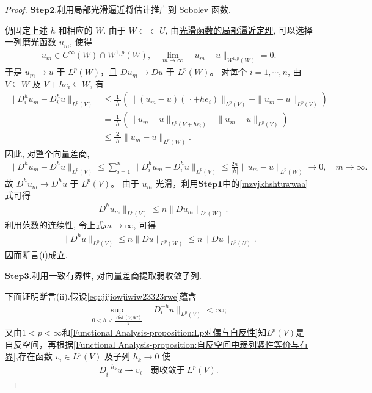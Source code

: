 \documentclass[../../main.tex]{subfiles}
\begin{document}
\begin{proof}
\noindent$\mathbf{Step}\bm{2}$.{\heiti 利用局部光滑逼近将估计推广到 Sobolev 函数.}

仍固定上述 $h$ 和相应的 $W$.
由于 $W\subset\subset U$, 由\hyperref[theorem:ch05-光滑函数的局部逼近定理]{光滑函数的局部逼近定理}, 可以选择一列磨光函数 $u_m$, 使得
\begin{align*}
u_m\in C^\infty(W)\cap W^{1,p}(W),\quad
\lim\limits_{m\to\infty}
\|u_m-u\|_{W^{1,p}(W)}=0.
\end{align*}
于是 $u_m\to u$ 于 $L^p(W)$，且 $Du_m\to Du$ 于 $L^p(W)$。
对每个 $i=1,\cdots,n$, 由 $V\subseteq W$ 及 $V+he_i\subseteq W$, 有
\begin{align*}
\|D_i^h u_m-D_i^h u\|_{L^p(V)}
&\leqslant
\frac{1}{|h|}
\left(
\|(u_m-u)(\,\cdot+he_i)\|_{L^p(V)}
+\|u_m-u\|_{L^p(V)}
\right)\\
&=
\frac{1}{|h|}
\left(
\|u_m-u\|_{L^p(V+he_i)}
+\|u_m-u\|_{L^p(V)}
\right)\\
&\leqslant
\frac{2}{|h|}\|u_m-u\|_{L^p(W)}.
\end{align*}
因此, 对整个向量差商,
\begin{align*}
\|D^h u_m-D^h u\|_{L^p(V)}
\leqslant
\sum\limits_{i=1}^n
\|D_i^h u_m-D_i^h u\|_{L^p(V)}
\leqslant
\frac{2n}{|h|}\|u_m-u\|_{L^p(W)}
\longrightarrow0,
\quad m\to\infty.
\end{align*}
故 $D^h u_m\to D^h u$ 于 $L^p(V)$。
由于 $u_m$ 光滑，利用$\mathbf{Step}\bm{1}$中的\eqref{mzvjkhshtuwwaa}式可得
\begin{align*}
\|D^h u_m\|_{L^p(V)}\leqslant n\|Du_m\|_{L^p(W)}.
\end{align*}
利用范数的连续性, 令上式$m\to\infty$, 可得
\begin{align*}
\|D^h u\|_{L^p(V)}
\leqslant n\|Du\|_{L^p(W)}\leqslant n\|Du\|_{L^p(U)}.
\end{align*}
因而断言(i)成立.

\noindent$\mathbf{Step}\bm{3}$.{\heiti 利用一致有界性, 对向量差商提取弱收敛子列.}

下面证明断言(ii).假设\eqref{eq::jijiowjiwiw23323rwe}蕴含
\begin{align*}
\sup_{0<h<\frac{\operatorname{dist}(V,\partial U)}{2}}\|D_{i}^{-h}u\|_{L^{p}(V)}<\infty;
\end{align*}
又由$1<p<\infty$和\cref{Functional Analysis-proposition:Lp对偶与自反性}知$L^p(V)$是自反空间，再根据\cref{Functional Analysis-proposition:自反空间中弱列紧性等价与有界},存在函数 $v_{i}\in L^{p}(V)$ 及子列 $h_{k}\to 0$ 使
\begin{align}\label{eqr::JIjiwjijjJFEW8334435JIOFJA-2}
D_{i}^{-h_{k}}u\rightharpoonup v_{i}\quad\text{弱收敛于}\ L^{p}(V).
\end{align}


\end{proof}
\end{document}
